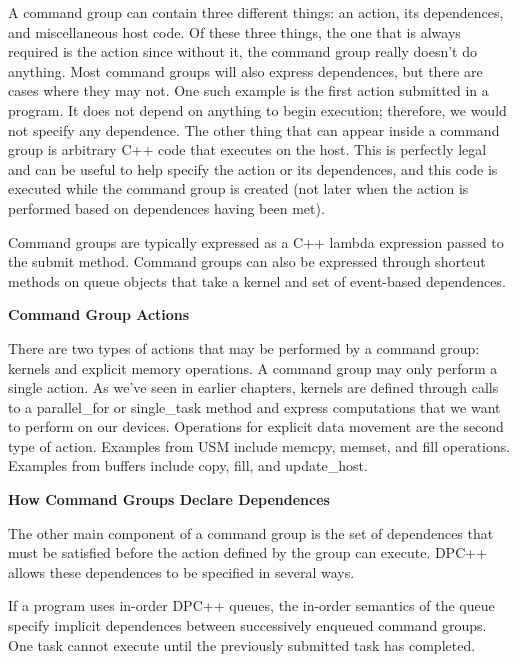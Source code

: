 A command group can contain three different things: an action, its dependences, and miscellaneous host code. Of these three things, the one that is always required is the action since without it, the command group really doesn’t do anything. Most command groups will also express dependences, but there are cases where they may not. One such example is the first action submitted in a program. It does not depend on anything to begin execution; therefore, we would not specify any dependence. The other thing that can appear inside a command group is arbitrary C++ code that executes on the host. This is perfectly legal and can be useful to help specify the action or its dependences, and this code is executed while the command group is created (not later when the action is performed based on dependences having been met).\par

Command groups are typically expressed as a C++ lambda expression passed to the submit method. Command groups can also be expressed through shortcut methods on queue objects that take a kernel and set of event-based dependences.\par

\hspace*{\fill} \par %
\textbf{Command Group Actions}

There are two types of actions that may be performed by a command group: kernels and explicit memory operations. A command group may only perform a single action. As we’ve seen in earlier chapters, kernels are defined through calls to a parallel\_for or single\_task method and express computations that we want to perform on our devices. Operations for explicit data movement are the second type of action. Examples from USM include memcpy, memset, and fill operations. Examples from buffers include copy, fill, and update\_host.\par

\hspace*{\fill} \par %
\textbf{How Command Groups Declare Dependences}

The other main component of a command group is the set of dependences that must be satisfied before the action defined by the group can execute. DPC++ allows these dependences to be specified in several ways.\par

If a program uses in-order DPC++ queues, the in-order semantics of the queue specify implicit dependences between successively enqueued command groups. One task cannot execute until the previously submitted task has completed.\par

